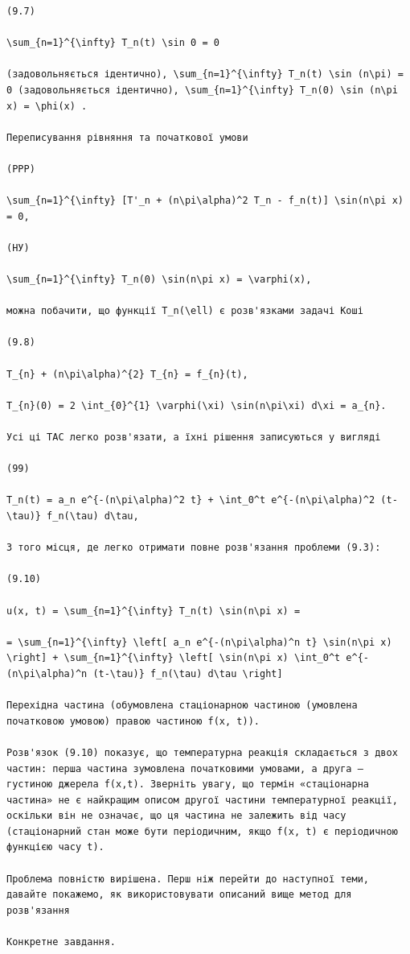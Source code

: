 \documentclass[
  ukrainian,
]{article}
\begin{document}
\begin{verbatim}
(9.7)

\sum_{n=1}^{\infty} T_n(t) \sin 0 = 0

(задовольняється ідентично), \sum_{n=1}^{\infty} T_n(t) \sin (n\pi) = 0 (задовольняється ідентично), \sum_{n=1}^{\infty} T_n(0) \sin (n\pi x) = \phi(x) .

Переписування рівняння та початкової умови

(PPP)

\sum_{n=1}^{\infty} [T'_n + (n\pi\alpha)^2 T_n - f_n(t)] \sin(n\pi x) = 0,

(НУ)

\sum_{n=1}^{\infty} T_n(0) \sin(n\pi x) = \varphi(x),

можна побачити, що функції T_n(\ell) є розв'язками задачі Коші

(9.8)

T_{n} + (n\pi\alpha)^{2} T_{n} = f_{n}(t),

T_{n}(0) = 2 \int_{0}^{1} \varphi(\xi) \sin(n\pi\xi) d\xi = a_{n}.

Усі ці TAC легко розв'язати, а їхні рішення записуються у вигляді

(99)

T_n(t) = a_n e^{-(n\pi\alpha)^2 t} + \int_0^t e^{-(n\pi\alpha)^2 (t-\tau)} f_n(\tau) d\tau,

З того місця, де легко отримати повне розв'язання проблеми (9.3):

(9.10)

u(x, t) = \sum_{n=1}^{\infty} T_n(t) \sin(n\pi x) =

= \sum_{n=1}^{\infty} \left[ a_n e^{-(n\pi\alpha)^n t} \sin(n\pi x) \right] + \sum_{n=1}^{\infty} \left[ \sin(n\pi x) \int_0^t e^{-(n\pi\alpha)^n (t-\tau)} f_n(\tau) d\tau \right]

Перехідна частина (обумовлена стаціонарною частиною (умовлена початковою умовою) правою частиною f(x, t)).

Розв'язок (9.10) показує, що температурна реакція складається з двох частин: перша частина зумовлена початковими умовами, а друга — густиною джерела f(x,t). Зверніть увагу, що термін «стаціонарна частина» не є найкращим описом другої частини температурної реакції, оскільки він не означає, що ця частина не залежить від часу (стаціонарний стан може бути періодичним, якщо f(x, t) є періодичною функцією часу t).

Проблема повністю вирішена. Перш ніж перейти до наступної теми, давайте покажемо, як використовувати описаний вище метод для розв'язання

Конкретне завдання.


\end{verbatim}
\end{document}
